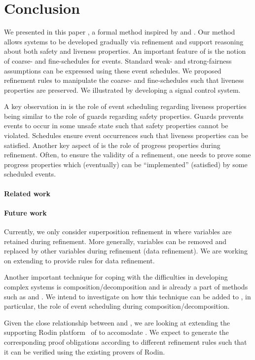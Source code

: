 \section{Conclusion}
\label{sec:conclusion}

We presented in this paper \unitb, a formal method inspired by \eventB
and \unity.  Our method allows systems to be developed gradually via
refinement and support reasoning about both safety and liveness
properties.  An important feature of \unitb is the notion of coarse-
and fine-schedules for events.  Standard weak- and strong-fairness
assumptions can be expressed using these event schedules.  We
proposed refinement rules to manipulate the coarse-
and fine-schedules such that liveness properties are
preserved.  We illustrated \unitb by developing a signal control
system.

A key observation in \unitb is the role of event scheduling regarding
liveness properties being similar to the role of guards regarding safety
properties.  Guards prevents events to occur in some unsafe state such
that safety properties cannot be violated.  Schedules ensure event
occurrences such that liveness properties can be satisfied.  Another
key aspect of \unitb is the role of progress properties during
refinement.  Often, to ensure the validity of a refinement, one needs
to prove some progress properties which (eventually) can be
``implemented'' (satisfied) by some scheduled events.

\paragraph{Related work}


\paragraph{Future work}
Currently, we only consider superposition refinement in \unitb where
variables are retained during refinement.  More generally, variables
can be removed and replaced by other variables during refinement (data
refinement). We are working on extending \unitb to provide rules for data
refinement.

Another important technique for coping with the difficulties in
developing complex systems is composition/decomposition and is already
a part of methods such as \eventB and \unity.  We intend to investigate
on how this technique can be added to \unitb, in particular, the role
of event scheduling during composition/decomposition.

Given the close relationship between \unitb and \eventB, we are
looking at extending the supporting Rodin
platform~\cite{abrial10:_rodin} of \eventB to accomodate \unitb.  We
expect to generate the corresponding proof obligations according to
different refinement rules such that it can be verified using the
existing provers of Rodin.


